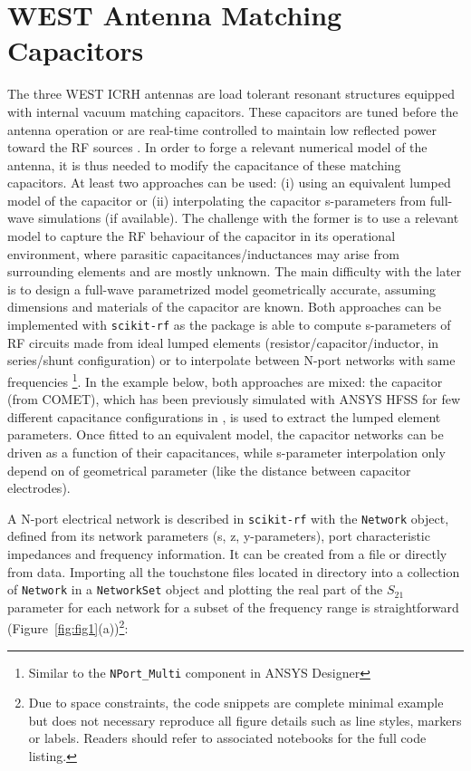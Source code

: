 \documentclass{aip-cp}
\begin{document}
	\section{WEST Antenna Matching Capacitors}
	The three WEST ICRH antennas are load tolerant resonant structures equipped with internal vacuum matching capacitors. These capacitors are tuned before the antenna operation or are real-time controlled to maintain low reflected power toward the RF sources \cite{Hillairet2015}. In order to forge a relevant numerical model of the antenna, it is thus needed to modify the capacitance of these matching capacitors. At least two approaches can be used: (i) using an equivalent lumped model of the capacitor or (ii) interpolating the capacitor s-parameters from full-wave simulations (if available). The challenge with the former is to use a relevant model to capture the RF behaviour of the capacitor in its operational environment, where parasitic capacitances/inductances may arise from surrounding elements and are mostly unknown. The main difficulty with the later is to design a full-wave parametrized model geometrically accurate, assuming dimensions and materials of the capacitor are known. Both approaches can be implemented with \texttt{scikit-rf} as the package is able to compute s-parameters of RF circuits made from ideal lumped elements (resistor/capacitor/inductor, in series/shunt configuration)  or to interpolate between N-port networks with same frequencies \footnote{Similar to the \texttt{NPort\_Multi} component in ANSYS Designer}. In the example below, both approaches are mixed: the capacitor (from COMET), which has been previously simulated with ANSYS HFSS for few different capacitance configurations in \cite{Helou2018_PhD}, is used to extract the lumped element parameters. Once fitted to an equivalent model, the capacitor networks can be driven as a function of their capacitances, while s-parameter interpolation only depend on of geometrical parameter (like the distance between capacitor electrodes).
	
	A N-port electrical network is described in \texttt{scikit-rf} with the \texttt{Network} object, defined from its network parameters (s, z, y-parameters),
	port characteristic impedances and frequency information. It can be created from a file or directly from data. Importing all the touchstone files located in directory into a collection of \texttt{Network} in a \texttt{NetworkSet} object and plotting the real part of the $S_{21}$ parameter for each network for a subset of the frequency range is straightforward (Figure~\ref{fig:fig1}(a))\footnote{Due to space constraints, the code snippets are complete minimal example but does not necessary reproduce all figure details such as line styles, markers or labels. Readers should refer to associated notebooks for the full code listing.}:
	
\end{document}
